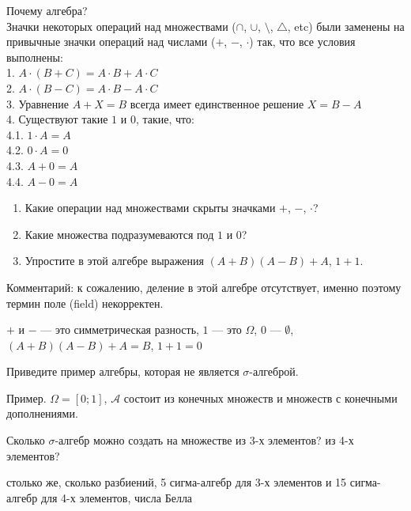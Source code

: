 \begin{problem}
 Почему алгебра? \\
Значки некоторых операций над множествами ($\cap$, $\cup$,
$\setminus$, $\triangle$, etc) были заменены на привычные значки
операций над числами ($+$, $-$, $\cdot$) так, что все условия выполнены: \\
1. $A\cdot(B+C)=A\cdot B+A\cdot C$ \\
2. $A\cdot(B-C)=A\cdot B-A\cdot C$ \\
3. Уравнение $A+X=B$ всегда имеет единственное решение $X=B-A$ \\
4. Существуют такие $1$ и $0$, такие, что: \\
4.1. $1\cdot A=A$ \\
4.2. $0\cdot A=0$ \\
4.3. $A+0=A$ \\
4.4. $A-0=A$ 
\begin{enumerate}
\item Какие операции над множествами скрыты значками $+$, $-$,
$\cdot$? 
\item Какие множества подразумеваются под $1$ и $0$? 
\item Упростите в этой алгебре выражения $(A+B)(A-B)+A$, $1+1$. 
\end{enumerate}
Комментарий: к сожалению, деление в этой алгебре отсутствует,
именно поэтому термин поле (field) некорректен. 
\end{problem} 
\begin{solution} 
$+$ и $-$ --- это симметрическая разность, $1$ --- это $\Omega$, $0$ --- $\emptyset$, $(A+B)(A-B)+A=B$, $1+1=0$
\end{solution}

\begin{problem}
Приведите пример алгебры, которая не является $\sigma$-алгеброй.
\end{problem} 
\begin{solution} 
Пример. $\Omega=[0;1]$, $\mathcal{A}$ состоит из конечных множеств и множеств с конечными дополнениями.
\end{solution}

\begin{problem}
Сколько $\sigma$-алгебр можно создать на множестве из 3-х элементов? из 4-х элементов? 
\end{problem} 
\begin{solution} 
столько же, сколько разбиений, 5 сигма-алгебр для 3-х элементов и 15 сигма-алгебр для 4-х элементов, числа Белла 
\end{solution}

